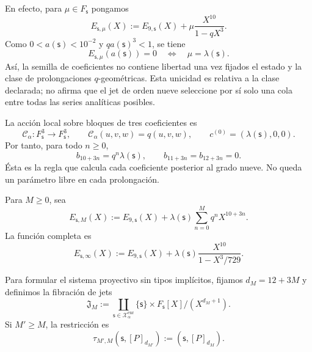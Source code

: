 En efecto, para \(\mu\in F_{\mathsf s}\) pongamos
\[
 E_{\mathsf s,\mu}(X)
 :=E_{9,\mathsf s}(X)+\mu\frac{X^{10}}{1-qX^3}.
\]
Como \(0<a(\mathsf s)<10^{-2}\) y \(qa(\mathsf s)^3<1\), se tiene
\begin{equation}
 E_{\mathsf s,\mu}(a(\mathsf s))=0
 \quad\Longleftrightarrow\quad
 \mu=\lambda(\mathsf s).
 \label{eq:alpha-unicidad-lambda-clase-geometrica}
\end{equation}
Así, la semilla de coeficientes no contiene libertad una vez fijados el estado
y la clase de prolongaciones \(q\)-geométricas. Esta unicidad es relativa a la
clase declarada; no afirma que el jet de orden nueve seleccione por sí solo una
cola entre todas las series analíticas posibles.

La acción local sobre bloques de tres coeficientes es
\begin{equation}
 \mathcal C_\alpha:F_{\mathsf s}^{3}\longrightarrow F_{\mathsf s}^{3},
 \qquad \mathcal C_\alpha(u,v,w)=q(u,v,w),
 \qquad c^{(0)}=(\lambda(\mathsf s),0,0).
 \label{eq:alpha-accion-coeficientes}
\end{equation}
Por tanto, para todo \(n\geq0\),
\begin{equation}
 b_{10+3n}=q^n\lambda(\mathsf s),\qquad
 b_{11+3n}=b_{12+3n}=0.
 \label{eq:alpha-recurrencia-coeficientes}
\end{equation}
Ésta es la regla que calcula cada coeficiente posterior al grado nueve. No
queda un parámetro libre en cada prolongación.

Para \(M\geq0\), sea
\begin{equation}
 E_{\mathsf s,M}(X):=E_{9,\mathsf s}(X)
 +\lambda(\mathsf s)\sum_{n=0}^{M}q^nX^{10+3n}.
 \label{eq:alpha-truncamientos-completos}
\end{equation}
La función completa es
\begin{equation}
 E_{\mathsf s,\infty}(X)
 :=E_{9,\mathsf s}(X)
 +\lambda(\mathsf s)\frac{X^{10}}{1-X^3/729}.
 \label{eq:alpha-funcion-completa-explicita}
\end{equation}

Para formular el sistema proyectivo sin tipos implícitos, fijamos
\(d_M=12+3M\) y definimos la fibración de jets
\begin{equation}
 \mathfrak J_M:=
 \coprod_{\mathsf s\in\mathcal X_\alpha^{\mathrm{enr}}}
 \{\mathsf s\}\times F_{\mathsf s}[X]/(X^{d_M+1}).
 \label{eq:alpha-espacio-jets-rev08}
\end{equation}
Si \(M'\ge M\), la restricción es
\begin{equation}
 \tau_{M',M}(\mathsf s,[P]_{d_{M'}})
 :=(\mathsf s,[P]_{d_M}).
 \label{eq:alpha-truncamiento-jets-rev08}
\end{equation}

